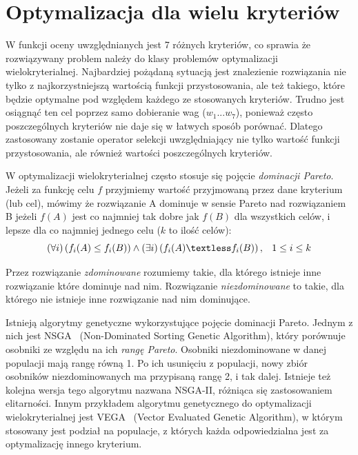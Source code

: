 \documentclass{xmgr}
\begin{document}
\section{Optymalizacja dla wielu kryteriów}

W funkcji oceny uwzględnianych jest 7 różnych kryteriów, co sprawia że rozwiązywany problem należy do klasy problemów optymalizacji wielokryterialnej. Najbardziej pożądaną sytuacją jest znalezienie rozwiązania nie tylko z najkorzystniejszą wartością funkcji przystosowania, ale też takiego, które będzie optymalne pod względem każdego ze stosowanych kryteriów. Trudno jest osiągnąć ten cel poprzez samo dobieranie wag ($w_1 ... w_7$), ponieważ często poszczególnych kryteriów nie daje się w łatwych sposób porównać. Dlatego zastosowany zostanie operator selekcji uwzględniający nie tylko wartość funkcji przystosowania, ale również wartości poszczególnych kryteriów.

W optymalizacji wielokryterialnej często stosuje się pojęcie \emph{dominacji Pareto}. Jeżeli za funkcję celu $f$ przyjmiemy wartość przyjmowaną przez dane kryterium (lub cel), mówimy że rozwiązanie A dominuje w sensie Pareto nad rozwiązaniem B jeżeli $f(A)$ jest co najmniej tak dobre jak $f(B)$ dla wszystkich celów, i lepsze dla co najmniej jednego celu ($k$ to ilość celów):
$$ \left( \forall i \right) \left( f_i(A) \le f_i(B) \right) \wedge \left( \exists i \right) \left( f_i(A) \textless f_i(B) \right), \hspace{8pt} 1 \le i \le k $$

Przez rozwiązanie \emph{zdominowane} rozumiemy takie, dla którego istnieje inne rozwiązanie które dominuje nad nim. Rozwiązanie \emph{niezdominowane} to takie, dla którego nie istnieje inne rozwiązanie nad nim dominujące.

Istnieją algorytmy genetyczne wykorzystujące pojęcie dominacji Pareto. Jednym z nich jest NSGA~\cite{SrinivasDeb} (Non-Dominated Sorting Genetic Algorithm), który porównuje osobniki ze względu na ich \emph{rangę Pareto}. Osobniki niezdominowane w danej populacji mają rangę równą 1. Po ich usunięciu z populacji, nowy zbiór osobników niezdominowanych ma przypisaną rangę 2, i tak dalej. Istnieje też kolejna wersja tego algorytmu nazwana NSGA-II, różniąca się zastosowaniem elitarności. Innym przykładem algorytmu genetycznego do optymalizacji wielokryterialnej jest VEGA~\cite{Shaffer1984} (Vector Evaluated Genetic Algorithm), w którym stosowany jest podział na populacje, z których każda odpowiedzialna jest za optymalizację innego kryterium.
\end{document}
